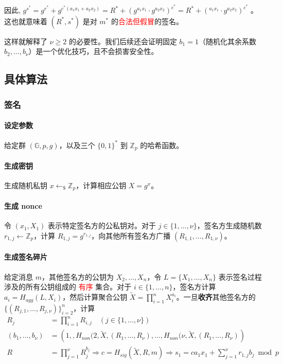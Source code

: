 \documentclass[a4paper,10pt]{article}
\newcommand{\bG}{\mathbb{G}}
\newcommand{\bZ}{\mathbb{Z}}
\begin{document}
因此, 
\(
  g^{s^*} = g^{r^*} + g^{c^* (a_1 x_1 + a_2 x_2)}
          = R^* + (g^{a_1 x_1}\cdot g^{a_2 x_2})^{c^*}
          = R^* + (^{a_1 x_1}\cdot g^{a_2 x_2})^{c^*}
\)
。这也就意味着 \((R^*,s^*)\) 是对 \(m^*\) 的\textcolor{red}{合法但假冒}的签名。

这样就解释了 \(\nu\geq 2\) 的必要性。我们后续还会证明固定 \(b_1=1\)（随机化其余系数 \(b_2,\dots,b_{\nu}\)）是一个优化技巧，且不会损害安全性。

\subsection{具体算法}
\subsubsection{签名}
\paragraph{设定参数} 给定群 \((\bG,p,g)\)，以及三个 \(\{0,1\}^*\) 到 \(\bZ_p\) 的哈希函数。
\paragraph{生成密钥} 生成随机私钥 \(x\leftarrow_{\$} \bZ_p\)，计算相应公钥 \(X=g^x\)。
\paragraph{生成 nonce} 令 \((x_1,X_1)\) 表示特定签名方的公私钥对。对于 \(j\in\{1,\dots,\nu\}\)，签名方生成随机数 \(r_{1,j}\leftarrow \bZ_p\)，计算 \(R_{1,j}=g^{r_{1,j}}\)，向其他所有签名方广播 \((R_{1,1},\dots,R_{1,\nu})\)。
\paragraph{生成签名碎片} 给定消息 \(m\)，其他签名方的公钥为 \(X_2,\dots,X_n\)，令 \(L=\{X_1,\dots,X_n\}\) 表示签名过程涉及的所有公钥组成的 \textcolor{red}{有序} 集合。对于 \(i\in\{1,\dots,n\}\)，签名方计算 \(a_i=H_{agg}(L,X_i)\)，然后计算聚合公钥 \(\tilde{X}=\prod_{i=1}^n X_i^{a_i}\)。一旦\textbf{收齐}其他签名方的 \(\big\{(R_{j,1},\dots,R_{j,\nu})\big\}_{i=2}^n\)，计算 
\begin{align*}
  R_j &= \prod_{i=1}^n R_{i,j}\quad (j\in\{1,\dots,\nu\}) \\
  (b_1,\dots,b_{\nu}) &=\left(1,,H_{non}(2,\tilde{X},(R_1,\dots,R_{\nu}),\dots,H_{non}(\nu,\tilde{X},(R_1,\dots,R_{\nu})\right) \\
  R &= \prod_{j=1}^{\nu} R_j^{b_j} \Rightarrow c = H_{sig}(\tilde{X},R,m) \Rightarrow s_1 = ca_1x_1+\sum_{j=1}^{\nu}r_{1,j}b_j\bmod p
\end{align*}
\end{document}
